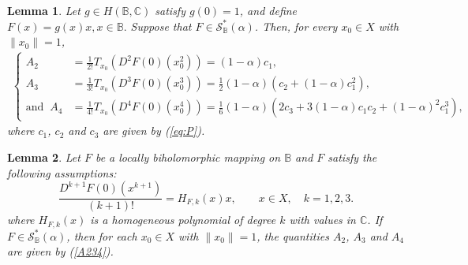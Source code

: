\documentclass[10pt,a4paper]{amsart}
\newtheorem{lem}{Lemma}
\newcommand{\bea}{\begin{eqnarray}}
\newcommand{\eea}{\end{eqnarray}}
\begin{document}
\begin{lem}\label{L4}  Let $g\in H(\mathbb{B},\mathbb{C})$ satisfy $g(0)=1$, and define $F(x)=g(x)x, x\in\mathbb{B}.$ Suppose that $F\in\mathcal{S}_{\mathbb{B}}^{*}(\alpha)$. Then, for every
$x_{0}\in X$ with $\|x_{0}\|=1$,
\bea\label{A234}
\begin{cases} A_{2}
&=
\frac{1}{2!}
T_{x_{0}}
\left(
D^{2}F(0)(x_{0}^{2})
\right)
=(1-\alpha)c_1,\\
A_{3}
&=
\frac{1}{3!}
T_{x_{0}}
\left(
D^{3}F(0)(x_{0}^{3})
\right)
=\frac{1}{2}(1-\alpha)\left(c_2+(1-\alpha)c_1^2\right),
\\
\text{and}\;\; 
A_{4}
&=
\frac{1}{4!}T_{x_{0}}\left(D^{4}F(0)(x_{0}^{4})\right)=\frac{1}{6}(1-\alpha)\left(2c_3+3(1-\alpha)c_1c_2+(1-\alpha)^2c_1^3\right),
\end{cases}
\eea
where $c_1$, $c_2$ and $c_3$ are given by (\ref{eq:P}).

\end{lem}

\begin{lem}\label{L5} Let $F$ be a locally biholomorphic mapping on $\mathbb{B}$ and $F$ satisfy the following assumptions:
\begin{equation}\label{cc1}
\frac{D^{k+1}F(0)\left(x^{k+1}\right)}{(k+1)!}
= H_{F,k}(x)x,\qquad x\in X,\quad k=1,2,3.
\end{equation}
where $H_{F,k}(x)$ is a homogeneous polynomial of degree $k$ with values in $\mathbb{C}$. If $F\in \mathcal{S}_{\mathbb{B}}^{*}(\alpha)$, then for each $x_0\in X$ with $\|x_0\|=1$,  the quantities $A_2$, $A_3$ and $A_4$ are given by  (\ref{A234}).
\end{lem}
\end{document}

